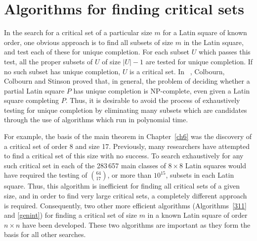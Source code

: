\documentclass[12pt]{report}
\begin{document}
\section{Algorithms for finding critical sets}
In the search for a critical set of a particular size $m$ for a Latin
square of known order, one obvious approach is to find all
subsets of size $m$ in the Latin square, and test each of these
for unique completion.  For each subset $U$ which passes this test,
all the proper subsets of $U$ of size $|U|-1$
are tested for unique completion.  If no such subset has unique
completion, $U$ is a critical set.  In ~\cite{MR85k:68035},
Colbourn, Colbourn and Stinson proved that, in general, the problem of deciding
whether a partial Latin square $P$ has unique completion
is NP-complete, even given a Latin square completing $P$.  Thus,
it is desirable to avoid the process of exhaustively testing for unique
completion by eliminating many subsets which are candidates through the
use of algorithms which run in polynomial time.

For example, the basis of the main theorem in Chapter~\ref{ch6} was the discovery
of a critical set of order 8 and size 17.  Previously, many researchers
have attempted to find a critical set of this size with no success.
To search exhaustively for any such critical set in each of the 283\,657
main classes of $8 \times 8$ Latin squares would have required the testing
of $\displaystyle{\binom{64}{17}}$, or more than $10^{15}$, subsets in each Latin square.
Thus, this algorithm is inefficient for finding all critical sets of a
given size, and in order to find very large critical sets, a completely
different approach is required.   Consequently, two other more efficient
algorithms (Algorithms~\ref{311} and \ref{genint}) for finding a critical set of size
$m$ in a known Latin square of order $n \times n$ have been developed.
These two algorithms are important as they form the basis for all other
searches.
\end{document}
